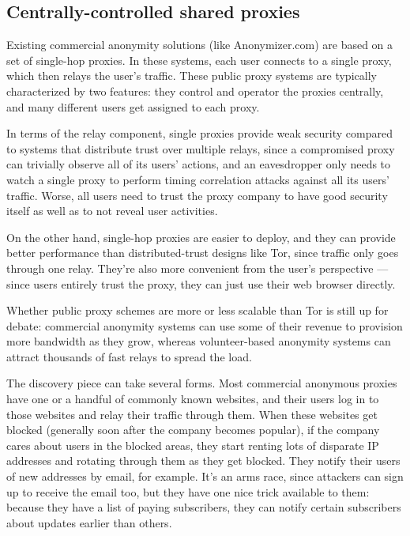 \documentclass{llncs}
\begin{document}
\subsection{Centrally-controlled shared proxies}

Existing commercial anonymity solutions (like Anonymizer.com) are based
on a set of single-hop proxies. In these systems, each user connects to
a single proxy, which then relays the user's traffic. These public proxy
systems are typically characterized by two features: they control and
operator the proxies centrally, and many different users get assigned
to each proxy.

In terms of the relay component, single proxies provide weak security
compared to systems that distribute trust over multiple relays, since a
compromised proxy can trivially observe all of its users' actions, and
an eavesdropper only needs to watch a single proxy to perform timing
correlation attacks against all its users' traffic. Worse, all users
need to trust the proxy company to have good security itself as well as
to not reveal user activities.

On the other hand, single-hop proxies are easier to deploy, and they
can provide better performance than distributed-trust designs like Tor,
since traffic only goes through one relay. They're also more convenient
from the user's perspective --- since users entirely trust the proxy,
they can just use their web browser directly.

Whether public proxy schemes are more or less scalable than Tor is
still up for debate: commercial anonymity systems can use some of their
revenue to provision more bandwidth as they grow, whereas volunteer-based
anonymity systems can attract thousands of fast relays to spread the load.

The discovery piece can take several forms. Most commercial anonymous
proxies have one or a handful of commonly known websites, and their users
log in to those websites and relay their traffic through them. When
these websites get blocked (generally soon after the company becomes
popular), if the company cares about users in the blocked areas, they
start renting lots of disparate IP addresses and rotating through them
as they get blocked. They notify their users of new addresses by email,
for example. It's an arms race, since attackers can sign up to receive the
email too, but they have one nice trick available to them: because they
have a list of paying subscribers, they can notify certain subscribers
about updates earlier than others.
\end{document}
